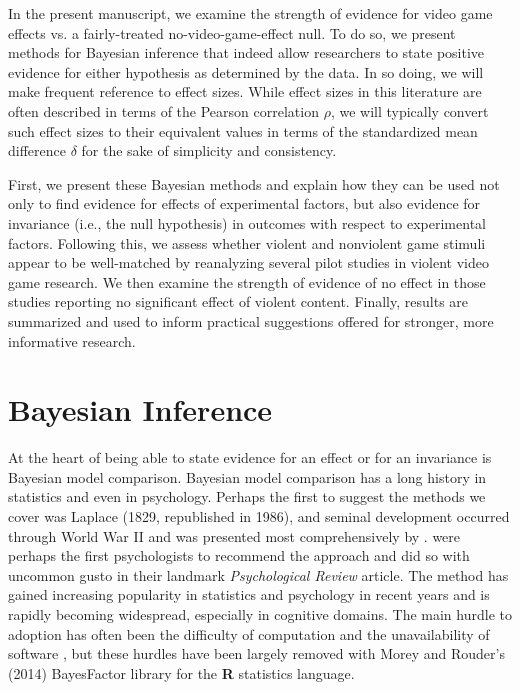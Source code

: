 \documentclass[man]{apa6}
\begin{document}
In the present manuscript, we examine the strength of evidence for video game effects vs. a fairly-treated no-video-game-effect null.  To do so, we present methods for Bayesian inference that indeed allow researchers to state positive evidence for either hypothesis as determined by the data. In so doing, we will make frequent reference to effect sizes. While effect sizes in this literature are often described in terms of the Pearson correlation $\rho$, we will typically convert such effect sizes to their equivalent values in terms of the standardized mean difference $\delta$ for the sake of simplicity and consistency.

First, we present these Bayesian methods and explain how they can be used not only to find evidence for effects of experimental factors, but also evidence for invariance (i.e., the null hypothesis) in outcomes with respect to experimental factors. Following this, we assess whether violent and nonviolent game stimuli appear to be well-matched by reanalyzing several pilot studies in violent video game research.  We then examine the strength of evidence of no effect in those studies reporting no significant effect of violent content.  Finally, results are summarized and used to inform practical suggestions offered for stronger, more informative research. 

\section{Bayesian Inference}
At the heart of being able to state evidence for an effect or for an invariance is Bayesian model comparison.  Bayesian model comparison has a long history in statistics and even in psychology.  Perhaps the first to suggest the methods we cover was Laplace (1829, republished in 1986), and seminal development occurred through World War II and was presented most comprehensively by \citet{Jeffreys:1961}.  \citet{Edwards:etal:1963} were perhaps the first psychologists to recommend the approach and did so with uncommon gusto in their landmark {\em Psychological Review} article.  The method has gained increasing popularity in statistics and psychology in recent years \citep{Berger:Delampady:1987,Gallistel:2009,Raftery:1995,Rouder:etal:2009a,Wagenmakers:2007} and is rapidly becoming widespread, especially in cognitive domains. The main hurdle to adoption has often been the difficulty of computation and the unavailability of software \citep{Gallistel:2009}, but these hurdles have been largely removed with Morey and Rouder's (2014) BayesFactor library for the {\bf R} statistics language.
\end{document}
